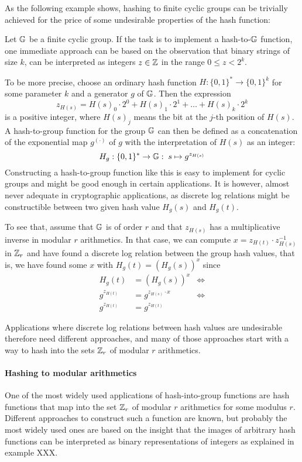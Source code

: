 As the following example shows, hashing to finite cyclic groups can be trivially achieved for the price of some undesirable properties of the hash function:
\begin{example} Let $\mathbb{G}$ be a finite cyclic group. If the task is to implement a hash-to-$\mathbb{G}$ function, one immediate approach can be based on the observation that binary strings of size $k$, can be interpreted as integers $z\in\mathbb{Z}$ in the range $0\leq z < 2^k$. 

To be more precise, choose an ordinary hash function $H:\{0,1\}^*\to \{0,1\}^k$ for some parameter $k$ and a generator $g$ of $\mathbb{G}$. Then the expression
$$
z_{H(s)}= H(s)_0\cdot 2^0 + H(s)_1\cdot 2^1 + \ldots + H(s)_k \cdot 2^k
$$
is a positive integer, where $H(s)_j$ means the bit at the $j$-th position of $H(s)$. A hash-to-group function for the group $\mathbb{G}$ can then be defined as a concatenation of the exponential map $g^{(\cdot)}$ of $g$ with the interpretation of $H(s)$ as an integer: 
$$
H_{g} : \{0,1\}^* \to \mathbb{G}:\; s \mapsto g^{z_{H(s)}} 
$$
Constructing a hash-to-group function like this is easy to implement for cyclic groups and might be good enough in certain applications. It is however, almost never adequate in cryptographic applications, as discrete log relations might be constructible between two given hash value $H_g(s)$ and $H_g(t)$. 

To see that, assume that $\mathbb{G}$ is of order $r$ and that $z_{H(s)}$ has a multiplicative inverse in modular $r$ arithmetics. In that case, we can compute $x=z_{H(t)}\cdot z_{H(s)}^{-1}$ in $\mathbb{Z}_r$ and have found a discrete log relation between the group hash values, that is, we have found some $x$ with $H_g(t) = (H_g(s))^x$ since
\begin{align*}
H_g(t) & = (H_g(s))^x & \Leftrightarrow \\
g^{z_{H(t)}} & = g^{z_{H(s)}\cdot x} & \Leftrightarrow \\
g^{z_{H(t)}} & = g^{z_{H(t)}}
\end{align*}
\end{example}
Applications where discrete log relations between hash values are undesirable therefore need different approaches, and many of those approaches start with a way to hash into the sets $\mathbb{Z}_r$ of modular $r$ arithmetics. 
\paragraph{Hashing to modular arithmetics} One of the most widely used applications of hash-into-group functions are hash functions that map into the set $\mathbb{Z}_r$ of modular $r$ arithmetics for some modulus $r$. Different approaches to construct such a function are known, but probably the most widely used ones are based on the insight that the images of arbitrary hash functions can be interpreted as binary representations of integers as explained in example XXX.

